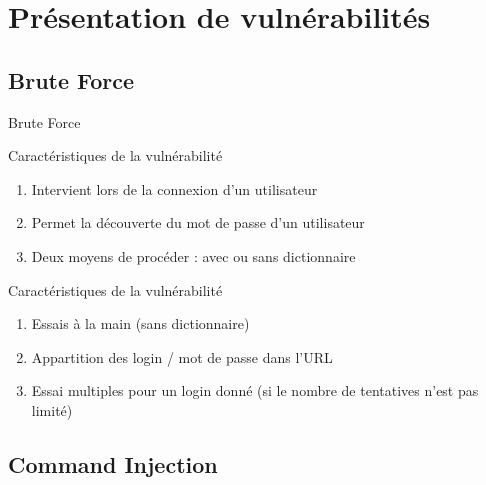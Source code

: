 \documentclass[8pt]{beamer}
\begin{document}
\section{Présentation de vulnérabilités}

\begin{frame}
  \tableofcontents[sectionstyle=show/shaded,subsectionstyle=show]
\end{frame}

\subsection{Brute Force}

\begin{frame}{Brute Force}

\begin{block}{Caractéristiques de la vulnérabilité}
	\begin{enumerate}[\ding{217}]
		\item Intervient lors de la connexion d'un utilisateur
		\item Permet la découverte du mot de passe d'un utilisateur
		\item Deux moyens de procéder : avec ou sans dictionnaire
	\end{enumerate}
\end{block}

\begin{block}{Caractéristiques de la vulnérabilité}
        \begin{enumerate}[\ding{217}]
                \item Essais à la main (sans dictionnaire)
		\item Appartition des login / mot de passe dans l'URL
		\item Essai multiples pour un login donné (si le nombre de tentatives n'est pas limité)
	\end{enumerate}
\end{block}
  
\end{frame}

\subsection{Command Injection}
\end{document}
